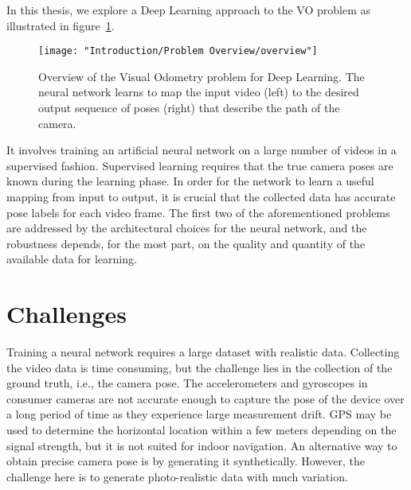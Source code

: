 		In this thesis, we explore a Deep Learning approach to the VO problem as illustrated in figure~\ref{fig:overview-visual-odometry}.
		\begin{figure}[t]
			\centering
			\texttt{[image: "Introduction/Problem Overview/overview"]}
			\caption[Description of the Visual Odometry problem]
					{Overview of the Visual Odometry problem for Deep Learning.
					 The neural network learns to map the input video (left) to the desired output sequence of poses (right) that describe the path of the camera.
					 \label{fig:overview-visual-odometry}}
		\end{figure}
		It involves training an artificial neural network on a large number of videos in a supervised fashion.
		Supervised learning requires that the true camera poses are known during the learning phase.
		In order for the network to learn a useful mapping from input to output, it is crucial that the collected data has accurate pose labels for each video frame.
		The first two of the aforementioned problems are addressed by the architectural choices for the neural network, and the robustness depends, for the most part, on the quality and quantity of the available data for learning.
		
		
	\section{Challenges}
		
		Training a neural network requires a large dataset with realistic data.
		Collecting the video data is time consuming, but the challenge lies in the collection of the ground truth, i.e., the camera pose.
		The accelerometers and gyroscopes in consumer cameras are not accurate enough to capture the pose of the device over a long period of time as they experience large measurement drift.
		GPS may be used to determine the horizontal location within a few meters depending on the signal strength, but it is not suited for indoor navigation.
		An alternative way to obtain precise camera pose is by generating it synthetically.
		However, the challenge here is to generate photo-realistic data with much variation.
		
